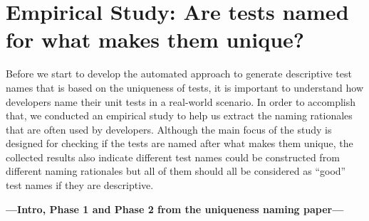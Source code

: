 \section{Empirical Study: Are tests named for what makes them unique?}
\label{sec:empStudy}

Before we start to develop the automated approach to generate descriptive test names that is based on the uniqueness of tests, it is important to understand how developers name their unit tests in a real-world scenario.
%
In order to accomplish that, we conducted an empirical study to help us extract the naming rationales that are often used by developers.
%
Although the main focus of the study is designed for checking if the tests are named after what makes them unique, the collected results also indicate different test names could be constructed from different naming rationales but all of them should all be considered as \enquote{good} test names if they are descriptive.

\textbf{---Intro, Phase 1 and Phase 2 from the uniqueness naming paper---}



